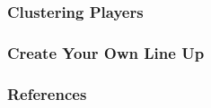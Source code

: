 \documentclass[xcolor=dvipsnames]{beamer}
\begin{document}
\begin{frame}
	\frametitle{Clustering Players}
%	
%	
%	
\end{frame}

\begin{frame}
	\frametitle{Create Your Own Line Up}
\end{frame}

\begin{frame}
	\frametitle{References}
\end{frame}
\end{document}
